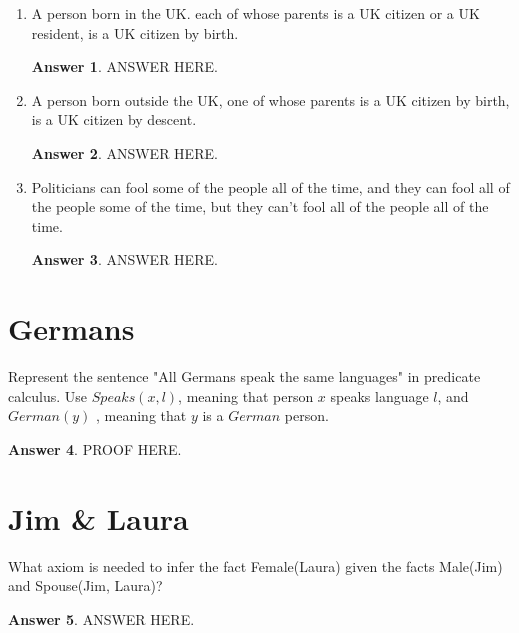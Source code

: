 \documentclass[a4paper]{article}
\renewcommand{\(}{\left(}
\renewcommand{\)}{\right)}
\theoremstyle{plain}
\theoremstyle{plain}
\theoremstyle{definition}
\newtheorem*{answer}{Answer}
\begin{document}
\begin{enumerate}[label*=\alph*.,ref=\alph*]
\item A person born in the UK. each of whose parents is a UK citizen or a UK resident, is a UK citizen by birth.
\begin{shaded}
\begin{answer}
ANSWER HERE.
\end{answer}
\end{shaded}

\item A person born outside the UK, one of whose parents is a UK citizen by birth, is a UK citizen by descent.
\begin{shaded}
\begin{answer}
ANSWER HERE.
\end{answer}
\end{shaded}

\item Politicians can fool some of the people all of the time, and they can fool all of the people some of the time, but they can't fool all of the people all of the time.
\begin{shaded}
\begin{answer}
ANSWER HERE.
\end{answer}
\end{shaded}


\end{enumerate}
\section{Germans}
 Represent the sentence "All Germans speak the same
languages" in predicate calculus. Use $Speaks(x,l)$, meaning that person $x$ speaks
language $l$, and $German(y)$ , meaning that $y$ is a $German$ person.
\begin{shaded}
\begin{answer}
PROOF HERE.
\end{answer}
\end{shaded}

\section{Jim \& Laura}
What axiom is needed to infer the fact Female(Laura) given the facts Male(Jim) and Spouse(Jim, Laura)?

\begin{shaded}
\begin{answer}
ANSWER HERE.
\end{answer}
\end{shaded}
\end{document}
